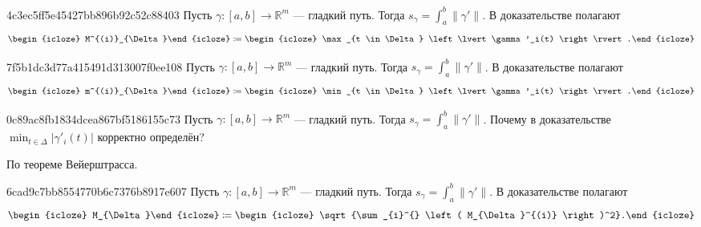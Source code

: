 \begin{note}{4c3ec5ff5e45427bb896b92c52c88403}
    Пусть \({ \gamma : [a, b] \to \mathbb R^{m} }\) --- гладкий путь.
    Тогда \({ s_\gamma = \int_{a}^{b} \left\lVert \gamma' \right\rVert }\).
    В доказательстве полагают
    \[
        \begin{icloze}{2}M^{(i)}_{\Delta}\end{icloze} \coloneqq \begin{icloze}{1}\max_{t \in \Delta} \left\lvert \gamma'_i(t) \right\rvert.\end{icloze}
    \]
\end{note}

\begin{note}{7f5b1dc3d77a415491d313007f0ee108}
    Пусть \({ \gamma : [a, b] \to \mathbb R^{m} }\) --- гладкий путь.
    Тогда \({ s_\gamma = \int_{a}^{b} \left\lVert \gamma' \right\rVert }\).
    В доказательстве полагают
    \[
        \begin{icloze}{2}m^{(i)}_{\Delta}\end{icloze} \coloneqq \begin{icloze}{1}\min_{t \in \Delta} \left\lvert \gamma'_i(t) \right\rvert.\end{icloze}
    \]
\end{note}

\begin{note}{0c89ac8fb1834dcea867bf5186155c73}
    Пусть \({ \gamma : [a, b] \to \mathbb R^{m} }\) --- гладкий путь.
    Тогда \({ s_\gamma = \int_{a}^{b} \left\lVert \gamma' \right\rVert }\).
    Почему в доказательстве \({ \displaystyle \min_{t \in \Delta} \left\lvert \gamma'_i(t) \right\rvert }\) корректно определён?

    \begin{cloze}{1}
        По теореме Вейерштрасса.
    \end{cloze}
\end{note}

\begin{note}{6cad9c7bb8554770b6c7376b8917e607}
    Пусть \({ \gamma : [a, b] \to \mathbb R^{m} }\) --- гладкий путь.
    Тогда \({ s_\gamma = \int_{a}^{b} \left\lVert \gamma' \right\rVert }\).
    В доказательстве полагают
    \[
        \begin{icloze}{2}M_{\Delta}\end{icloze} \coloneqq \begin{icloze}{1}\sqrt{\sum_{i}^{} \left( M_{\Delta}^{(i)} \right)^2}.\end{icloze}
    \]
\end{note}

